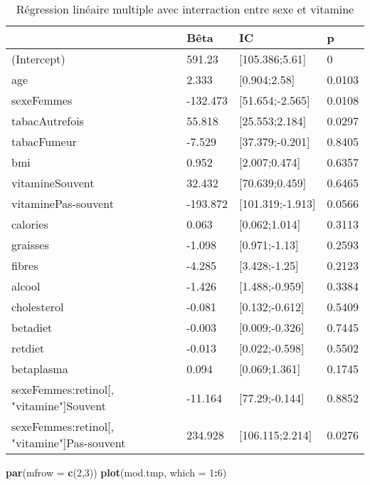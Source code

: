 \documentclass[]{article}
\newenvironment{Shaded}{\begin{snugshade}}{\end{snugshade}}
\newcommand{\KeywordTok}[1]{\textcolor[rgb]{0.13,0.29,0.53}{\textbf{#1}}}
\newcommand{\DataTypeTok}[1]{\textcolor[rgb]{0.13,0.29,0.53}{#1}}
\newcommand{\DecValTok}[1]{\textcolor[rgb]{0.00,0.00,0.81}{#1}}
\newcommand{\OperatorTok}[1]{\textcolor[rgb]{0.81,0.36,0.00}{\textbf{#1}}}
\newcommand{\NormalTok}[1]{#1}
\begin{document}
\begin{table}

\caption{\label{tab:unnamed-chunk-62}Régression linéaire multiple avec interraction entre sexe et vitamine}
\centering
\begin{tabular}[t]{l|l|l|l}
\hline
  & Bêta & IC & p\\
\hline
\rowcolor[HTML]{BBD2E1}  (Intercept) & 591.23 & [105.386;5.61] & 0\\
\hline
age & 2.333 & [0.904;2.58] & 0.0103\\
\hline
\rowcolor[HTML]{BBD2E1}  sexeFemmes & -132.473 & [51.654;-2.565] & 0.0108\\
\hline
tabacAutrefois & 55.818 & [25.553;2.184] & 0.0297\\
\hline
\rowcolor[HTML]{BBD2E1}  tabacFumeur & -7.529 & [37.379;-0.201] & 0.8405\\
\hline
bmi & 0.952 & [2.007;0.474] & 0.6357\\
\hline
\rowcolor[HTML]{BBD2E1}  vitamineSouvent & 32.432 & [70.639;0.459] & 0.6465\\
\hline
vitaminePas-souvent & -193.872 & [101.319;-1.913] & 0.0566\\
\hline
\rowcolor[HTML]{BBD2E1}  calories & 0.063 & [0.062;1.014] & 0.3113\\
\hline
graisses & -1.098 & [0.971;-1.13] & 0.2593\\
\hline
\rowcolor[HTML]{BBD2E1}  fibres & -4.285 & [3.428;-1.25] & 0.2123\\
\hline
alcool & -1.426 & [1.488;-0.959] & 0.3384\\
\hline
\rowcolor[HTML]{BBD2E1}  cholesterol & -0.081 & [0.132;-0.612] & 0.5409\\
\hline
betadiet & -0.003 & [0.009;-0.326] & 0.7445\\
\hline
\rowcolor[HTML]{BBD2E1}  retdiet & -0.013 & [0.022;-0.598] & 0.5502\\
\hline
betaplasma & 0.094 & [0.069;1.361] & 0.1745\\
\hline
\rowcolor[HTML]{BBD2E1}  sexeFemmes:retinol[, "vitamine"]Souvent & -11.164 & [77.29;-0.144] & 0.8852\\
\hline
sexeFemmes:retinol[, "vitamine"]Pas-souvent & 234.928 & [106.115;2.214] & 0.0276\\
\hline
\end{tabular}
\end{table}

\begin{Shaded}
\begin{Highlighting}[]
\KeywordTok{par}\NormalTok{(}\DataTypeTok{mfrow =} \KeywordTok{c}\NormalTok{(}\DecValTok{2}\NormalTok{,}\DecValTok{3}\NormalTok{))}
\KeywordTok{plot}\NormalTok{(mod.tmp, }\DataTypeTok{which =} \DecValTok{1}\OperatorTok{:}\DecValTok{6}\NormalTok{)}
\end{Highlighting}
\end{Shaded}
\end{document}
